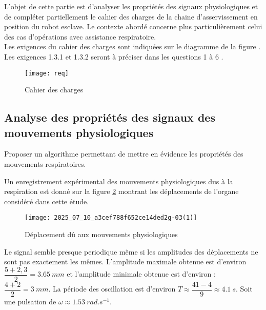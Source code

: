 L'objet de cette partie est d'analyser les propriétés des signaux physiologiques et de compléter partiellement le cahier des charges de la chaine d'asservissement en position du robot esclave. Le contexte abordé concerne plus particulièrement celui des cas d'opérations avec assistance respiratoire.\\
Les exigences du cahier des charges sont indiquées sur le diagramme de la figure \label{ccs_psi_2019_fig_03}. Les exigences 1.3.1 et 1.3.2 seront à préciser dans les questions 1 à 6 .


\begin{figure}[!h]
\centering
\texttt{[image: req]}

\caption{Cahier des charges\label{ccs_psi_2019_fig_03}}
\end{figure}


\subsection{Analyse des propriétés des signaux des mouvements physiologiques}
\begin{obj}
Proposer un algorithme permettant de mettre en évidence les propriétés des mouvements respiratoires.
\end{obj}

Un enregistrement expérimental des mouvements physiologiques dus à la respiration est donné sur la figure \ref{ccs_psi_2019_fig_04} montrant les déplacements de l'organe considéré dans cette étude.


\begin{figure}[!h]
\centering
\texttt{[image: 2025\_07\_10\_a3cef788f652ce14ded2g-03(1)]}

\caption{Déplacement dû aux mouvements physiologiques\label{ccs_psi_2019_fig_04}}
\end{figure}


\ifprof
\begin{corrige}
Le signal semble presque periodique même si les amplitudes des déplacements ne sont pas exactement les mêmes.
L'amplitude maximale obtenue est d'environ $\dfrac{5+2,3}{2}=\SI{3,65}{mm}$ et l'amplitude minimale obtenue est d'environ : $\dfrac{4+2}{2}=\SI{3}{mm}$. 
La période des oscillation est d'environ $
T\approx\dfrac{41-4}{9}\approx \SI{4,1}{s}$. 
Soit une pulsation de $\omega\approx \SI{1,53}{rad.s^{-1}}$.
\end{corrige}
\else
\fi

